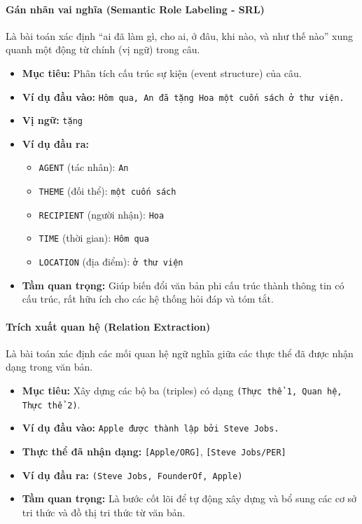\paragraph{Gán nhãn vai nghĩa (Semantic Role Labeling - SRL)}
Là bài toán xác định “ai đã làm gì, cho ai, ở đâu, khi nào, và như thế nào” xung quanh một động từ chính (vị ngữ) trong câu.
\begin{itemize}
    \item \textbf{Mục tiêu:} Phân tích cấu trúc sự kiện (event structure) của câu.
    \item \textbf{Ví dụ đầu vào:} \texttt{Hôm qua, An đã tặng Hoa một cuốn sách ở thư viện.}
    \item \textbf{Vị ngữ:} \texttt{tặng}
    \item \textbf{Ví dụ đầu ra:}
        \begin{itemize}
            \item \texttt{AGENT} (tác nhân): \texttt{An}
            \item \texttt{THEME} (đối thể): \texttt{một cuốn sách}
            \item \texttt{RECIPIENT} (người nhận): \texttt{Hoa}
            \item \texttt{TIME} (thời gian): \texttt{Hôm qua}
            \item \texttt{LOCATION} (địa điểm): \texttt{ở thư viện}
        \end{itemize}
    \item \textbf{Tầm quan trọng:} Giúp biến đổi văn bản phi cấu trúc thành thông tin có cấu trúc, rất hữu ích cho các hệ thống hỏi đáp và tóm tắt.
\end{itemize}

\paragraph{Trích xuất quan hệ (Relation Extraction)}
Là bài toán xác định các mối quan hệ ngữ nghĩa giữa các thực thể đã được nhận dạng trong văn bản.
\begin{itemize}
    \item \textbf{Mục tiêu:} Xây dựng các bộ ba (triples) có dạng \texttt{(Thực thể 1, Quan hệ, Thực thể 2)}.
    \item \textbf{Ví dụ đầu vào:} \texttt{Apple được thành lập bởi Steve Jobs.}
    \item \textbf{Thực thể đã nhận dạng:} \texttt{[Apple/ORG]}, \texttt{[Steve Jobs/PER]}
    \item \textbf{Ví dụ đầu ra:} \texttt{(Steve Jobs, FounderOf, Apple)}
    \item \textbf{Tầm quan trọng:} Là bước cốt lõi để tự động xây dựng và bổ sung các cơ sở tri thức và đồ thị tri thức từ văn bản.
\end{itemize}

